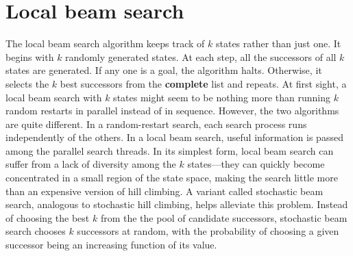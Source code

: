 \section{ Local beam search}
The local beam search algorithm keeps track of $k$ states rather than just one. It begins with $k$ randomly generated states. At each step, all the successors of all $k$ states are generated. If any one is a goal, the algorithm halts. Otherwise, it selects the $k$ best successors from the \textbf{complete} list and repeats.\newline\newline
At first sight, a local beam search with $k$ states might seem to be nothing more than running $k$ random restarts in parallel instead of in sequence. However, the two algorithms are quite different. In a random-restart search, each search process runs independently of the others. In a local beam search, useful information is passed among the parallel search threads.\newline\newline
In its simplest form, local beam search can suffer from a lack of diversity among the $k$ states—they can quickly become concentrated in a small region of the state space, making the search little more than an expensive version of hill climbing. A variant called stochastic beam search, analogous to stochastic hill climbing, helps alleviate this problem. Instead of choosing the best $k$ from the the pool of candidate successors, stochastic beam search
chooses $k$ successors at random, with the probability of choosing a given successor being an increasing function of its value.

